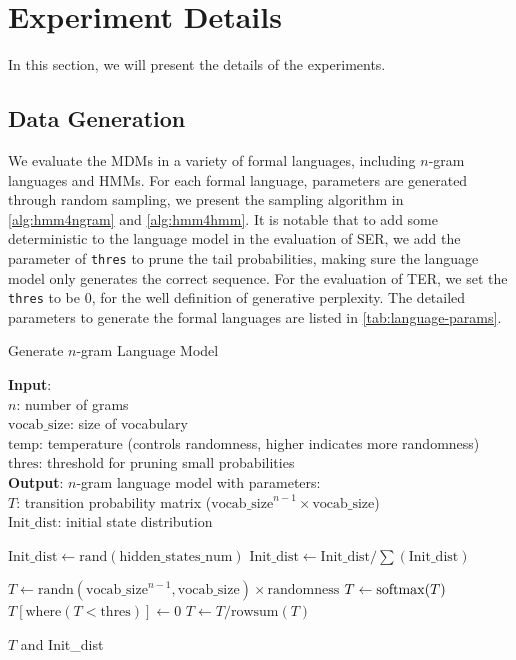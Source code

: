 
\section{Experiment Details}
\label{app:exp_detail}

In this section, we will present the details of the experiments.
\vspace{-10pt}
\subsection{Data Generation}
\label{app:data}
We evaluate the MDMs in a variety of formal languages, including $n$-gram languages and HMMs. For each formal language, parameters are generated through random sampling, we present the sampling algorithm in \cref{alg:hmm4ngram} and \cref{alg:hmm4hmm}. It is notable that to add some deterministic to the language model in the evaluation of SER, we add the parameter of \texttt{thres} to prune the tail probabilities, making sure the language model only generates the correct sequence. For the evaluation of TER, we set the \texttt{thres} to be $0$, for the well definition of generative perplexity. The detailed parameters to generate the formal languages are listed in \cref{tab:language-params}.

\begin{algorithm}[H]
\caption{Generate $n$-gram Language Model}
\label{alg:hmm4ngram}
\textbf{Input}: \\
\quad $n$: number of grams \\
\quad $\text{vocab\_size}$: size of vocabulary \\
\quad $\text{temp}$: temperature (controls randomness, higher indicates more randomness) \\
\quad $\text{thres}$: threshold for pruning small probabilities \\
\textbf{Output}: $n$-gram language model with parameters: \\
\quad $T$: transition probability matrix ($\text{vocab\_size}^{n-1} \times \text{vocab\_size}$) \\
\quad $\text{Init\_dist}$: initial state distribution
\begin{algorithmic}[1]

\STATE $\text{Init\_dist} \gets \text{rand}(\text{hidden\_states\_num})$
\STATE $\text{Init\_dist} \gets \text{Init\_dist} / \sum(\text{Init\_dist})$

\STATE $T \gets \text{randn}(\text{vocab\_size}^{n-1}, \text{vocab\_size}) \times \text{randomness}$ 
\STATE $T \gets \mathrm{softmax}(T)$
    \STATE $T[\text{where}(T < \text{thres})] \gets 0$
    \STATE $T \gets T / \text{rowsum}(T)$
\ENDIF

\RETURN $T$ and Init\_dist

\end{algorithmic}
\end{algorithm}

